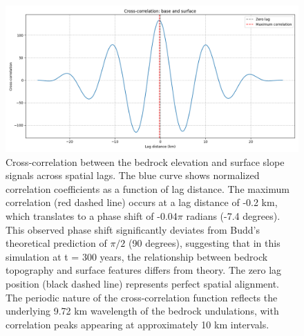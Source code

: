 \begin{figure}
    \includegraphics[scale=0.5]{xcorr.png}
    \caption{Cross-correlation between the bedrock elevation and surface slope signals across spatial lags. The blue curve shows normalized correlation coefficients as a function of lag distance. The maximum correlation (red dashed line) occurs at a lag distance of -0.2 km, which translates to a phase shift of -0.04$\pi$ radians (-7.4 degrees). This observed phase shift significantly deviates from Budd's theoretical prediction of $\pi/2$ (90 degrees), suggesting that in this simulation at t = 300 years, the relationship between bedrock topography and surface features differs from theory. The zero lag position (black dashed line) represents perfect spatial alignment. The periodic nature of the cross-correlation function reflects the underlying 9.72 km wavelength of the bedrock undulations, with correlation peaks appearing at approximately 10 km intervals.}
    \label{fig:xcorr}
\end{figure}

